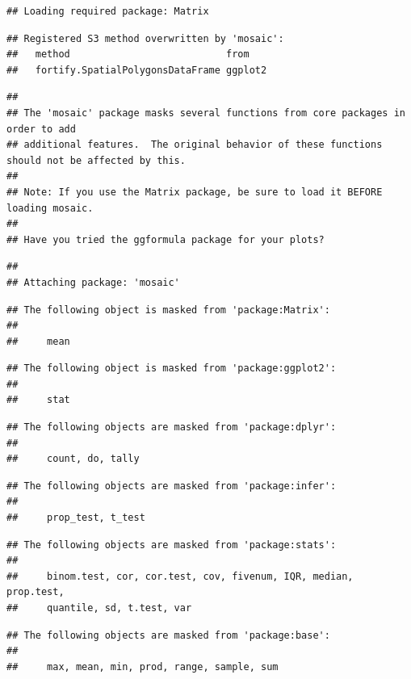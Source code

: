 \documentclass[
]{book}
\begin{document}
\begin{verbatim}
## Loading required package: Matrix
\end{verbatim}

\begin{verbatim}
## Registered S3 method overwritten by 'mosaic':
##   method                           from   
##   fortify.SpatialPolygonsDataFrame ggplot2
\end{verbatim}

\begin{verbatim}
## 
## The 'mosaic' package masks several functions from core packages in order to add 
## additional features.  The original behavior of these functions should not be affected by this.
## 
## Note: If you use the Matrix package, be sure to load it BEFORE loading mosaic.
## 
## Have you tried the ggformula package for your plots?
\end{verbatim}

\begin{verbatim}
## 
## Attaching package: 'mosaic'
\end{verbatim}

\begin{verbatim}
## The following object is masked from 'package:Matrix':
## 
##     mean
\end{verbatim}

\begin{verbatim}
## The following object is masked from 'package:ggplot2':
## 
##     stat
\end{verbatim}

\begin{verbatim}
## The following objects are masked from 'package:dplyr':
## 
##     count, do, tally
\end{verbatim}

\begin{verbatim}
## The following objects are masked from 'package:infer':
## 
##     prop_test, t_test
\end{verbatim}

\begin{verbatim}
## The following objects are masked from 'package:stats':
## 
##     binom.test, cor, cor.test, cov, fivenum, IQR, median, prop.test,
##     quantile, sd, t.test, var
\end{verbatim}

\begin{verbatim}
## The following objects are masked from 'package:base':
## 
##     max, mean, min, prod, range, sample, sum
\end{verbatim}
\end{document}
